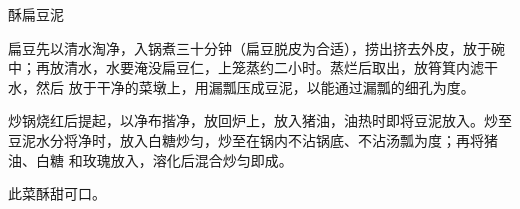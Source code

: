 \begin{recipe}{酥扁豆泥}

\ingredients


\preparation

\step 扁豆先以清水淘净，入锅煮三十分钟（扁豆脱皮为合适），捞出挤去外皮，放于碗
中；再放清水，水要淹没扁豆仁，上笼蒸约二小时。蒸烂后取出，放筲箕内滤干水，然后
放于干净的菜墩上，用漏瓢压成豆泥，以能通过漏瓢的细孔为度。

\step 炒锅烧红后提起，以净布揩净，放回炉上，放入猪油，油热时即将豆泥放入。炒至
豆泥水分将净时，放入白糖炒匀，炒至在锅内不沾锅底、不沾汤瓢为度；再将猪油、白糖
和玫瑰放入，溶化后混合炒匀即成。

\features

此菜酥甜可口。

\end{recipe}


